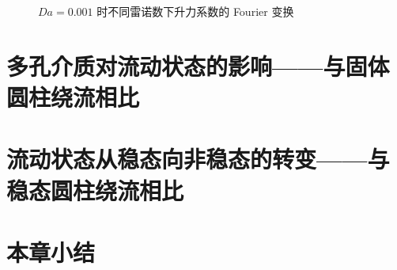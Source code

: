 \begin{figure}
	\centering
	\begin{minipage}{\textwidth}
		\centering
	\end{minipage}
	\centering
	\begin{minipage}{\textwidth}
		\centering
	\end{minipage}
	\centering
	\begin{minipage}{\textwidth}
		\centering
	\end{minipage}
	\centering
	\begin{minipage}{\textwidth}
		\centering
	\end{minipage}
	\caption{$Da=0.001$ 时不同雷诺数下升力系数的 Fourier 变换}
	\label{fig: Cl Fourier-1e-3}
\end{figure}

\section{多孔介质对流动状态的影响——与固体圆柱绕流相比}

\section{流动状态从稳态向非稳态的转变——与稳态圆柱绕流相比}

\section{本章小结}
